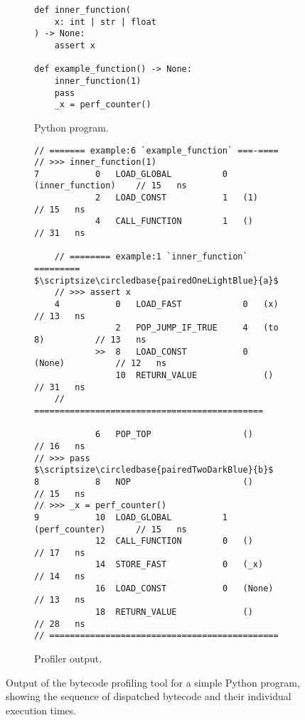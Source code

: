 \begin{figure}[H]
    \centering
    \begin{subfigure}[b]{0.3\textwidth}
       \centering
        \begin{verbatim}
def inner_function(
    x: int | str | float
) -> None:
    assert x

def example_function() -> None:
    inner_function(1)
    pass
    _x = perf_counter()
        \end{verbatim}
        \footnotesize\vspace{8em}
        \caption{Python program.}
        \label{listing:profiler-example-python}
    \end{subfigure}
    \hfill
    \begin{subfigure}[b]{0.65\textwidth}
        \centering
        \begin{verbatim}
// ======= example:6 `example_function` ===-====
// >>> inner_function(1)
7           0   LOAD_GLOBAL          0   (inner_function)    // 15   ns
            2   LOAD_CONST           1   (1)                 // 15   ns
            4   CALL_FUNCTION        1   ()                  // 31   ns

    // ======== example:1 `inner_function` ========= $\scriptsize\circledbase{pairedOneLightBlue}{a}$
    // >>> assert x
    4           0   LOAD_FAST            0   (x)             // 13   ns
                2   POP_JUMP_IF_TRUE     4   (to 8)          // 13   ns
            >>  8   LOAD_CONST           0   (None)          // 12   ns
                10  RETURN_VALUE             ()              // 31   ns
    // =============================================

            6   POP_TOP                  ()                  // 16   ns
// >>> pass                                                     $\scriptsize\circledbase{pairedTwoDarkBlue}{b}$
8           8   NOP                      ()                  // 15   ns
// >>> _x = perf_counter()
9           10  LOAD_GLOBAL          1   (perf_counter)      // 15   ns
            12  CALL_FUNCTION        0   ()                  // 17   ns
            14  STORE_FAST           0   (_x)                // 14   ns
            16  LOAD_CONST           0   (None)              // 13   ns
            18  RETURN_VALUE             ()                  // 28   ns
// =============================================
        \end{verbatim}
        \caption{Profiler output.}
        \label{listing:profiler-example-bytecode}
    \end{subfigure}
    \vspace{1em}
    \captionsetup{name=Listing}
    \caption{Output of the bytecode profiling tool for a simple Python program, showing the sequence of dispatched bytecode and their individual execution times.}
    \label{listing:profiler-example}
\end{figure}









